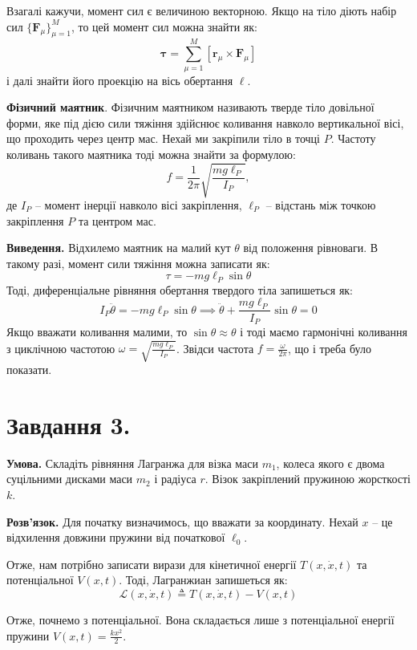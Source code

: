 \documentclass[14pt]{extarticle}
\begin{document}
Взагалі кажучи, момент сил є величиною векторною. Якщо на тіло діють набір сил $\{\mathbf{F}_{\mu}\}_{\mu=1}^M$, то цей момент сил можна знайти як:
\[
\boldsymbol{\tau} = \sum_{\mu=1}^M [\mathbf{r}_{\mu} \times \mathbf{F}_{\mu}] 
\]
і далі знайти його проекцію на вісь обертання $\ell$. 

\textbf{Фізичний маятник}. Фізичним маятником називають тверде тіло довільної форми, яке під дією сили тяжіння здійснює коливання навколо вертикальної вісі, що проходить через центр мас. Нехай ми закріпили тіло в точці $P$. Частоту коливань такого маятника тоді можна знайти за формулою:
\[
f = \frac{1}{2\pi}\sqrt{\frac{mg\ell_P}{I_P}},
\]
де $I_P$ -- момент інерції навколо вісі закріплення, $\ell_P$ -- відстань між точкою закріплення $P$ та центром мас.

\textbf{Виведення.} Відхилемо маятник на малий кут $\theta$ від положення рівноваги. В такому разі, момент сили тяжіння можна записати як:
\[
\tau = -mg\ell_P \sin\theta
\]
Тоді, диференціальне рівняння обертання твердого тіла запишеться як:
\[
I_P \ddot{\theta} = -mg\ell_P \sin \theta \implies \boxed{\ddot{\theta} + \frac{mg\ell_P}{I_P}\sin\theta = 0}
\]
Якщо вважати коливання малими, то $\sin\theta \approx \theta$ і тоді маємо гармонічні коливання з циклічною частотою $\omega=\sqrt{\frac{mg\ell_P}{I_P}}$. Звідси частота $f=\frac{\omega}{2\pi}$, що і треба було показати.

\pagebreak

\section*{Завдання 3.}

\textbf{Умова.} Складіть рівняння Лагранжа для візка маси $m_1$, колеса якого є двома суцільними дисками маси $m_2$ і радіуса $r$. Візок закріплений пружиною жорсткості $k$.

\textbf{Розв'язок.} Для початку визначимось, що вважати за координату. Нехай $x$ -- це відхилення довжини пружини від початкової $\ell_0$. 

Отже, нам потрібно записати вирази для кінетичної енергії $T(x,\dot{x},t)$ та потенціальної $V(x,t)$. Тоді, Лагранжиан запишеться як:
\[
\mathcal{L}(x,\dot{x},t) \triangleq T(x,\dot{x},t) - V(x,t)
\]

Отже, почнемо з потенціальної. Вона складається лише з потенціальної енергії пружини $V(x,t) = \frac{kx^2}{2}$. 
\end{document}
